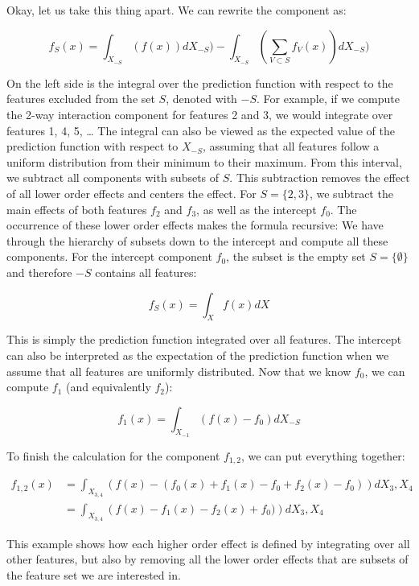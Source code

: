 \documentclass[
  12pt,
]{krantz}
\begin{document}
Okay, let us take this thing apart.
We can rewrite the component as:

\[f_S(x) = \int_{X_{-S}} \left( f(x)\right) d X_{-S}) - \int_{X_{-S}} \left(\sum_{V \subset S} f_V(x) \right) d X_{-S})\]

On the left side is the integral over the prediction function with respect to the features excluded from the set \(S\), denoted with \(-S\).
For example, if we compute the 2-way interaction component for features 2 and 3, we would integrate over features 1, 4, 5, \ldots{}
The integral can also be viewed as the expected value of the prediction function with respect to \(X_{-S}\), assuming that all features follow a uniform distribution from their minimum to their maximum.
From this interval, we subtract all components with subsets of \(S\).
This subtraction removes the effect of all lower order effects and centers the effect.
For \(S=\{2,3\}\), we subtract the main effects of both features \(f_2\) and \(f_3\), as well as the intercept \(f_0\).
The occurrence of these lower order effects makes the formula recursive: We have through the hierarchy of subsets down to the intercept and compute all these components.
For the intercept component \(f_0\), the subset is the empty set \(S=\{\emptyset\}\) and therefore \(-S\) contains all features:

\[f_S(x) = \int_{X} f(x) dX\]

This is simply the prediction function integrated over all features.
The intercept can also be interpreted as the expectation of the prediction function when we assume that all features are uniformly distributed.
Now that we know \(f_0\), we can compute \(f_1\) (and equivalently \(f_2\)):

\[f_1(x) = \int_{X_{-1}} \left( f(x) - f_0\right) d X_{-S}\]

To finish the calculation for the component \(f_{1,2}\), we can put everything together:

\begin{align*}f_{1,2}(x) &= \int_{X_{3,4}} \left( f(x) - (f_0(x) + f_1(x) - f_0 + f_2(x) - f_0)\right) d X_{3},X_4 \\  &= \int_{X_{3,4}} \left(f(x) - f_1(x) - f_2(x) + f_0)\right) d X_{3},X_4 \end{align*}

This example shows how each higher order effect is defined by integrating over all other features, but also by removing all the lower order effects that are subsets of the feature set we are interested in.
\end{document}
